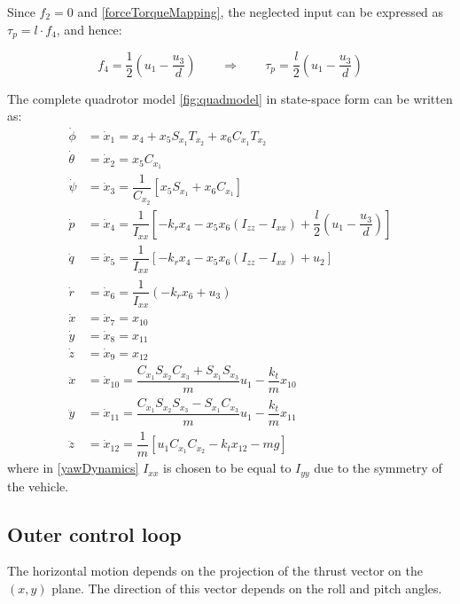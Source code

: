 \documentclass[11pt,a4paper]{scrartcl}
\begin{document}
Since $ f_2 = 0 $ and \eqref{forceTorqueMapping}, the neglected input can be expressed as $ \tau_p = l \cdot f_4 $, and hence:

\begin{equation}
	f_4 = \dfrac{1}{2}( u_1 - \dfrac{u_3}{d}) \qquad \Rightarrow \qquad \tau_p = \dfrac{l}{2}(u_1 -\dfrac{u_3}{d})
\end{equation}

The complete quadrotor model \eqref{fig:quadmodel} in state-space form can be written as:
\begin{subequations}
\begin{align}
	\dot{\phi} & = \dot{x}_1 = x_4 + x_5 S_{x_1} T_{x_2} + x_6 C_{x_1} T_{x_2} \\
	\dot{\theta} & = \dot{x}_2 = x_5 C_{x_1} \\
	\dot{\psi} & =  \dot{x}_3 = \dfrac{1}{C_{x_2}} [ x_5 S_{x_1} + x_6 C_{x_1}] \\
	\dot{p} & = \dot{x}_4 = \dfrac{1}{I_{xx}}[-k_r x_4 - x_5 x_6 (I_{zz} - I_{xx}) + \dfrac{l}{2} (u_1 -\dfrac{u_3}{d})] \label{rollDynamics} \\
	\dot{q} & = \dot{x}_5 = \dfrac{1}{I_{xx}}[-k_r x_4 - x_5 x_6 (I_{zz} - I_{xx}) + u_2] \label{pitchDynamics} \\
	\dot{r} & = \dot{x}_6 = \dfrac{1}{I_{xx}}(-k_r x_6 + u_3) \label{yawDynamics}\\
	\dot{x} & = \dot{x}_7 = x_{10} \\
	\dot{y} & = \dot{x}_8 = x_{11} \\
	\dot{z} & = \dot{x}_9 = x_{12} \\
	\ddot{x} & = \dot{x}_{10} = \dfrac{C_{x_1} S_{x_2} C_{x_3} + S_{x_1} S_{x_3}}{m} u_1 - \dfrac{k_t}{m}x_{10} \\
	\ddot{y} & = \dot{x}_{11} = \dfrac{C_{x_1} S_{x_2} S_{x_3} - S_{x_1} C_{x_3}}{m} u_1 - \dfrac{k_t}{m}x_{11} \\
	\ddot{z} & = \dot{x}_{12} = \dfrac{1}{m} [u_1 C_{x_1} C_{x_2} - k_t x_{12} - m g]
\end{align}
\label{completeQuadModel}
\end{subequations}
where in \eqref{yawDynamics} $ I_{xx} $ is chosen to be equal to $ I_{yy} $ due to the symmetry of the vehicle.

\subsection{Outer control loop}

The horizontal motion depends on the projection of the thrust vector on the $ (x,y) $ plane. The direction of this vector depends on the roll and pitch angles.
\end{document}
